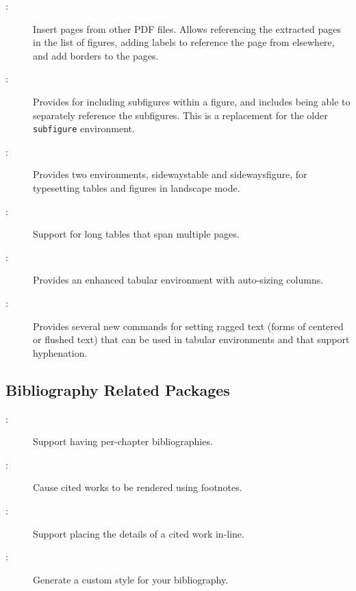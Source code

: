 \begin{description}
\item[:]
    Insert pages from other PDF files.  Allows referencing the extracted
    pages in the list of figures, adding labels to reference the page
    from elsewhere, and add borders to the pages.

\item[:]
    Provides for including subfigures within a figure, and includes
    being able to separately reference the subfigures.  This is a
    replacement for the older \texttt{subfigure} environment.

\item[:]
    Provides two environments, sidewaystable and sidewaysfigure,
    for typesetting tables and figures in landscape mode.  

\item[:]
    Support for long tables that span multiple pages.

\item[:]
    Provides an enhanced tabular environment with auto-sizing columns.

\item[:]
    Provides several new commands for setting ragged text (\eg forms
    of centered or flushed text) that can be used in tabular
    environments and that support hyphenation.

\end{description}


\subsection{Bibliography Related Packages}

\begin{description}
\item[:]
    Support having per-chapter bibliographies.

\item[:]
    Cause cited works to be rendered using footnotes.

\item[:] 
    Support placing the details of a cited work in-line.

\item[:]
    Generate a custom style for your bibliography.

\end{description}


